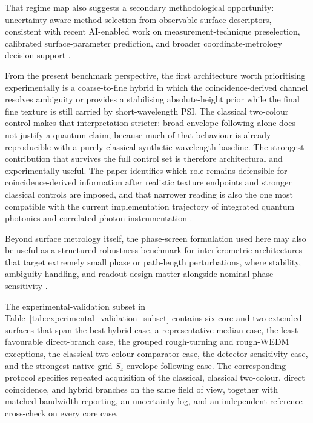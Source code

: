\documentclass[photonics,article,submit,pdftex,moreauthors]{Definitions/mdpi}
\begin{document}
That regime map also suggests a secondary methodological opportunity: uncertainty-aware method selection from observable surface descriptors, consistent with recent AI-enabled work on measurement-technique preselection, calibrated surface-parameter prediction, and broader coordinate-metrology decision support \cite{kucharski2025multitask-b68,Kucharski2024,Wieczorowski2023}.

From the present benchmark perspective, the first architecture worth prioritising experimentally is a coarse-to-fine hybrid in which the coincidence-derived channel resolves ambiguity or provides a stabilising absolute-height prior while the final fine texture is still carried by short-wavelength PSI. The classical two-colour control makes that interpretation stricter: broad-envelope following alone does not justify a quantum claim, because much of that behaviour is already reproducible with a purely classical synthetic-wavelength baseline. The strongest contribution that survives the full control set is therefore architectural and experimentally useful. The paper identifies which role remains defensible for coincidence-derived information after realistic texture endpoints and stronger classical controls are imposed, and that narrower reading is also the one most compatible with the current implementation trajectory of integrated quantum photonics and correlated-photon instrumentation \cite{Mahmudlu2023518,Labbe2025,Yin20221316}.

Beyond surface metrology itself, the phase-screen formulation used here may also be useful as a structured robustness benchmark for interferometric architectures that target extremely small phase or path-length perturbations, where stability, ambiguity handling, and readout design matter alongside nominal phase sensitivity \cite{AdvancedLIGO2015,AmelinoCamelia1999,Chou2017}.

The experimental-validation subset in Table~\ref{tab:experimental_validation_subset} contains six core and two extended surfaces that span the best hybrid case, a representative median case, the least favourable direct-branch case, the grouped rough-turning and rough-WEDM exceptions, the classical two-colour comparator case, the detector-sensitivity case, and the strongest native-grid $S_z$ envelope-following case. The corresponding protocol specifies repeated acquisition of the classical, classical two-colour, direct coincidence, and hybrid branches on the same field of view, together with matched-bandwidth reporting, an uncertainty log, and an independent reference cross-check on every core case.
\end{document}
